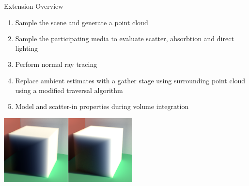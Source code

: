 \documentclass[10pt,compress,professionalfont]{beamer}
\begin{document}
\begin{frame}{Extension Overview}

    \begin{enumerate}
        \item Sample the scene and generate a point cloud
        \item \alert{ Sample the participating media to evaluate scatter, absorbtion and direct lighting}
        \item Perform normal ray tracing
        \item Replace ambient estimates with a gather stage using surrounding point cloud \alert{using a modified traversal algorithm}
        \item \alert{ Model and scatter-in properties during volume integration}
    \end{enumerate}
    \vspace{4mm}
    {\centering
        \includegraphics[width=70mm]{../img/inscat_comp2}\\
    }

\end{frame}
\end{document}
